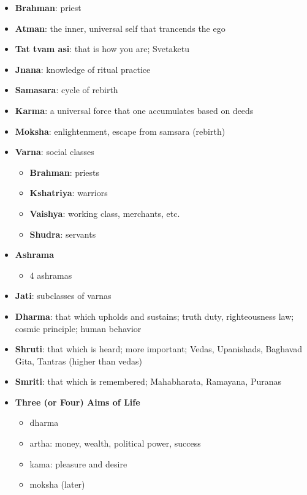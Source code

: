 \documentclass[11pt]{article} %
\begin{document}
\begin{itemize}
\item
{\bf Brahman}: priest

\item
{\bf Atman}: the inner, universal self that trancends the ego

\item
{\bf Tat tvam asi}: that is how you are; Svetaketu

\item
{\bf Jnana}: knowledge of ritual practice

\item
{\bf Samasara}: cycle of rebirth

\item
{\bf Karma}: a universal force that one accumulates based on deeds

\item
{\bf Moksha}: enlightenment, escape from samsara (rebirth)

\item
{\bf Varna}: social classes
\begin{itemize}
\item {\bf Brahman}: priests
\item {\bf Kshatriya}: warriors
\item {\bf Vaishya}: working class, merchants, etc.
\item {\bf Shudra}: servants
\end{itemize}

\item
{\bf Ashrama}
\begin{itemize}
\item 4 ashramas
\end{itemize}

\item
{\bf Jati}: subclasses of varnas

\item
{\bf Dharma}: that which upholds and sustains; truth duty, righteousness law; cosmic principle; human behavior

\item
{\bf Shruti}: that which is heard; more important; Vedas, Upanishads, Baghavad Gita, Tantras (higher than vedas)

\item
{\bf Smriti}: that which is remembered; Mahabharata, Ramayana, Puranas

\item
{\bf Three (or Four) Aims of Life}
\begin{itemize}
\item dharma
\item artha: money, wealth, political power, success
\item kama: pleasure and desire
\item moksha (later)
\end{itemize}


\end{itemize}
\end{document}
